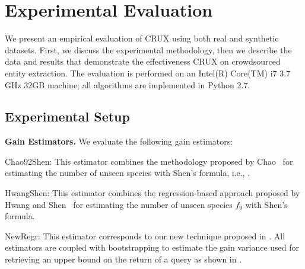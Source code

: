 

\section{Experimental Evaluation}
\label{sec:exps}
We present an empirical evaluation of CRUX using both real and synthetic datasets. First, we discuss the experimental methodology, then we describe the data and results that demonstrate the effectiveness CRUX on crowdsourced entity extraction. The evaluation is performed on an Intel(R) Core(TM) i7 3.7 GHz 32GB machine; all algorithms are implemented in Python 2.7. 

\subsection{Experimental Setup}
\label{sec:expsetup}
\vspace{2pt}\noindent\textbf{Gain Estimators.} We evaluate the following gain estimators:
\squishlist
\item Chao92Shen: This estimator combines the methodology proposed by Chao~\cite{chao:1992} for estimating the number of unseen species  with Shen's formula, i.e., .
\item HwangShen: This estimator combines the regression-based approach proposed by Hwang and Shen~\cite{hwang:2010} for estimating the number of unseen species $f_0$ with Shen's formula. 
\item NewRegr: This estimator corresponds to our new technique proposed in .
\squishend
All estimators are coupled with bootstrapping to estimate the gain variance used for retrieving an upper bound on the return of a query as shown in .

